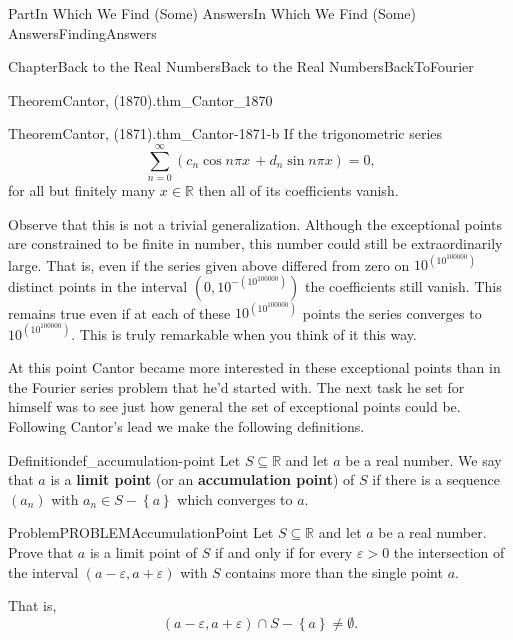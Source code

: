 \documentclass[oneside,10pt,]{book}
\newcommand{\terminology}[1]{\textbf{#1}}
\numberwithin{equation}{part}
\newcommand{\eps}{\varepsilon}
\newcommand{\RR}{\mathbb {R}}
\begin{document}
\begin{partptx}{Part}{In Which We Find (Some) Answers}{}{In Which We Find (Some) Answers}{}{}{FindingAnswers}
\begin{chapterptx}{Chapter}{Back to the Real Numbers}{}{Back to the Real Numbers}{}{}{BackToFourier}
\begin{introduction}{}
\begin{theorem}{Theorem}{Cantor, (1870).}{}{thm_Cantor_1870}
\end{theorem}
\begin{theorem}{Theorem}{Cantor, (1871).}{}{thm_Cantor-1871-b}%
%
%
If the trigonometric series%
\begin{equation*}
\sum_{n=0}^\infty\left(c_n\cos n\pi x\,+d_n\sin n\pi
x\right) = 0 \text{,}
\end{equation*}
for all but finitely many \(x\in\RR\) then all of its coefficients vanish.%
\end{theorem}
Observe that this is not a trivial generalization.  Although the exceptional points are constrained to be finite in number, this number could still be extraordinarily large.  That is, even if the series given above differed from zero on \(10^{\left(10^{100000}\right)}\) distinct points in the interval \(\left(0, 10^{-\left(10^{100000}\right)}\right)\) the coefficients still vanish.  This remains true even if at each of these \(10^{\left(10^{100000}\right)}\) points the series converges to \(10^{\left(10^{100000}\right)}\).  This is truly remarkable when you think of it this way.%
\par
At this point Cantor became more interested in these exceptional points than in the Fourier series problem that he'd started with.  The next task he set for himself was to see just how general the set of exceptional points could be.  Following Cantor's lead we make the following definitions.%
\begin{definition}{Definition}{}{def_accumulation-point}%
%
%
%
%
Let \(S\subseteq \RR\) and let \(a\) be a real number. We say that \(a\) is a \terminology{limit point} (or an \terminology{accumulation point}) of \(S\) if there is a sequence \((a_n)\) with \(a_n\in S-\left\{a\right\}\) which converges to \(a\).%
\end{definition}
\begin{problem}{Problem}{}{PROBLEMAccumulationPoint}%
Let \(S\subseteq\RR\) and let \(a\) be a real number. Prove that \(a\) is a limit point of \(S\) if and only if for every \(\eps>0\) the intersection of the interval \((a-\eps, a+\eps)\) with \(S\) contains more than the single point \({a}\).%
\par
That is,%
\begin{equation*}
(a-\eps, a+\eps) \cap S -\left\{a\right\} \neq \emptyset. 

\end{equation*}
\end{problem}
\end{introduction}
\end{chapterptx}
\end{partptx}
\end{document}
